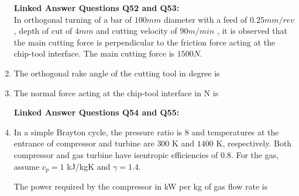 \documentclass[journal]{IEEEtran}
\begin{document}
\begin{enumerate}[leftmargin=0pt]
\textbf{Linked Answer Questions Q52 and Q53:}  \\
In orthogonal turning of a bar of $100 mm$ diameter with a feed of $0.25 mm/rev$ , depth of cut of $4 mm$ and cutting velocity of $90 m/min$ , it is observed that the main  cutting force is perpendicular to the friction force acting at the chip-tool interface. The main cutting force is $1500 N$.\\
\item
The orthogonal rake angle of the cutting tool in degree is
\begin{enumerate}
\end{enumerate}
\hfill{}

\item The normal force acting at the chip-tool interface in N is
\begin{enumerate}
\end{enumerate}
\hfill{}

\textbf{Linked Answer Questions Q54 and Q55:}  
\item
In a simple Brayton cycle, the pressure ratio is $8$ and temperatures at the entrance of compressor and turbine are $300$ K and $1400$ K, respectively. Both compressor and gas turbine have isentropic efficiencies of $0.8$. For the gas, assume $c_p = 1$ kJ/kgK and $\gamma = 1.4$.

The power required by the compressor in kW per kg of gas flow rate is
\begin{enumerate}
\end{enumerate}
\hfill{}


\end{enumerate}
\end{document}
